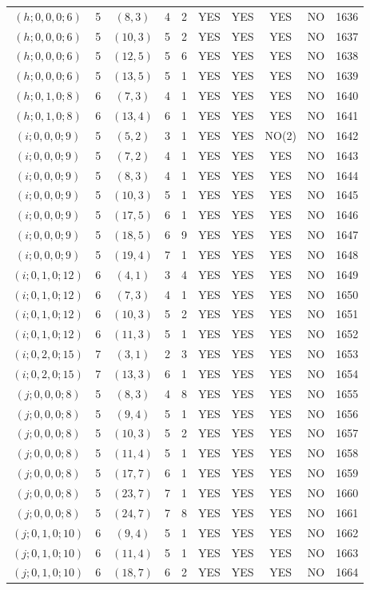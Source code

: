 \begin{longtable}{|c|c|c|c|c|c|c|c|c|c|}
$(h; 0, 0, 0; 6)$ & 5 & $(8, 3)$ & 4 & 2 & YES & YES & YES & NO & 1636\\
$(h; 0, 0, 0; 6)$ & 5 & $(10, 3)$ & 5 & 2 & YES & YES & YES & NO & 1637\\
$(h; 0, 0, 0; 6)$ & 5 & $(12, 5)$ & 5 & 6 & YES & YES & YES & NO & 1638\\
$(h; 0, 0, 0; 6)$ & 5 & $(13, 5)$ & 5 & 1 & YES & YES & YES & NO & 1639\\
$(h; 0, 1, 0; 8)$ & 6 & $(7, 3)$ & 4 & 1 & YES & YES & YES & NO & 1640\\
$(h; 0, 1, 0; 8)$ & 6 & $(13, 4)$ & 6 & 1 & YES & YES & YES & NO & 1641\\
$(i; 0, 0, 0; 9)$ & 5 & $(5, 2)$ & 3 & 1 & YES & YES & NO(2) & NO & 1642\\
$(i; 0, 0, 0; 9)$ & 5 & $(7, 2)$ & 4 & 1 & YES & YES & YES & NO & 1643\\
$(i; 0, 0, 0; 9)$ & 5 & $(8, 3)$ & 4 & 1 & YES & YES & YES & NO & 1644\\
$(i; 0, 0, 0; 9)$ & 5 & $(10, 3)$ & 5 & 1 & YES & YES & YES & NO & 1645\\
$(i; 0, 0, 0; 9)$ & 5 & $(17, 5)$ & 6 & 1 & YES & YES & YES & NO & 1646\\
$(i; 0, 0, 0; 9)$ & 5 & $(18, 5)$ & 6 & 9 & YES & YES & YES & NO & 1647\\
$(i; 0, 0, 0; 9)$ & 5 & $(19, 4)$ & 7 & 1 & YES & YES & YES & NO & 1648\\
$(i; 0, 1, 0; 12)$ & 6 & $(4, 1)$ & 3 & 4 & YES & YES & YES & NO & 1649\\
$(i; 0, 1, 0; 12)$ & 6 & $(7, 3)$ & 4 & 1 & YES & YES & YES & NO & 1650\\
$(i; 0, 1, 0; 12)$ & 6 & $(10, 3)$ & 5 & 2 & YES & YES & YES & NO & 1651\\
$(i; 0, 1, 0; 12)$ & 6 & $(11, 3)$ & 5 & 1 & YES & YES & YES & NO & 1652\\
$(i; 0, 2, 0; 15)$ & 7 & $(3, 1)$ & 2 & 3 & YES & YES & YES & NO & 1653\\
$(i; 0, 2, 0; 15)$ & 7 & $(13, 3)$ & 6 & 1 & YES & YES & YES & NO & 1654\\
$(j; 0, 0, 0; 8)$ & 5 & $(8, 3)$ & 4 & 8 & YES & YES & YES & NO & 1655\\
$(j; 0, 0, 0; 8)$ & 5 & $(9, 4)$ & 5 & 1 & YES & YES & YES & NO & 1656\\
$(j; 0, 0, 0; 8)$ & 5 & $(10, 3)$ & 5 & 2 & YES & YES & YES & NO & 1657\\
$(j; 0, 0, 0; 8)$ & 5 & $(11, 4)$ & 5 & 1 & YES & YES & YES & NO & 1658\\
$(j; 0, 0, 0; 8)$ & 5 & $(17, 7)$ & 6 & 1 & YES & YES & YES & NO & 1659\\
$(j; 0, 0, 0; 8)$ & 5 & $(23, 7)$ & 7 & 1 & YES & YES & YES & NO & 1660\\
$(j; 0, 0, 0; 8)$ & 5 & $(24, 7)$ & 7 & 8 & YES & YES & YES & NO & 1661\\
$(j; 0, 1, 0; 10)$ & 6 & $(9, 4)$ & 5 & 1 & YES & YES & YES & NO & 1662\\
$(j; 0, 1, 0; 10)$ & 6 & $(11, 4)$ & 5 & 1 & YES & YES & YES & NO & 1663\\
$(j; 0, 1, 0; 10)$ & 6 & $(18, 7)$ & 6 & 2 & YES & YES & YES & NO & 1664
\end{longtable}
